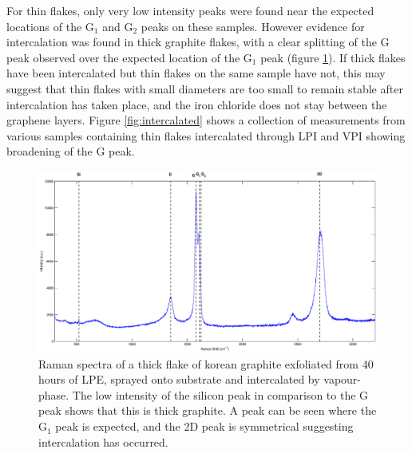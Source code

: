 \documentclass[12pt,titlepage]{article}
\begin{document}
	For thin flakes, only very low intensity peaks were found near the expected locations of the G$_1$ and G$_2$ peaks on these samples. However evidence for intercalation was found in thick graphite flakes, with a clear splitting of the G peak observed over the expected location of the G$_1$ peak (figure \ref{fig:graphite-vpi}). If thick flakes have been intercalated but thin flakes on the same sample have not, this may suggest that thin flakes with small diameters are too small to remain stable after intercalation has taken place, and the iron chloride does not stay between the graphene layers. Figure \ref{fig:intercalated} shows a collection of measurements from various samples containing thin flakes intercalated through LPI and VPI showing broadening of the G peak.
	
	\begin{figure}
		\centering
		\includegraphics[width=1\textwidth]{figures/graphite-vpi.eps}
		\caption[Graphite intercalated by vapour phase.]{Raman spectra of a thick flake of korean graphite exfoliated from 40 hours of LPE, sprayed onto substrate and intercalated by vapour-phase. The low intensity of the silicon peak in comparison to the G peak shows that this is thick graphite. A peak can be seen where the G$_1$ peak is expected, and the 2D peak is symmetrical suggesting intercalation has occurred.}
		\label{fig:graphite-vpi}
	\end{figure}
	
\end{document}
